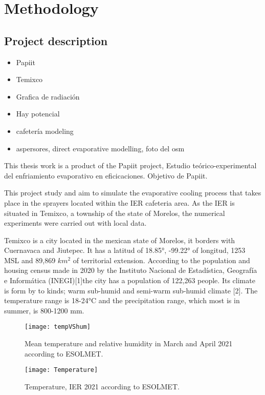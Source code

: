 \chapter{Methodology}
\label{chap:methodology}

 
 
 \section{Project description}
 
 \begin{itemize}
  	\item Papiit
 	\item Temixco
 	\item Grafica de radiación
 	\item Hay potencial
 	\item cafetería modeling
 	\item aspersores, direct evaporative modelling, foto del osm
 \end{itemize}
 

This thesis work is a product of the Papiit project, Estudio teórico-experimental del enfriamiento evaporativo en eficicaciones.
Objetivo de Papiit. 

This project study and aim to simulate the evaporative cooling process that takes place in the sprayers located within the IER cafeteria area. As the IER is situated in Temixco, a township of the state of Morelos, the numerical experiments were carried out with local data.

 Temixco is a city located in the mexican state of Morelos, it borders with Cuernavaca and Jiutepec. It has a latitud of 18.85°, -99.22° of longitud, 1253 MSL and 89,869 $km^{2}$ of territorial extension. According to the population and housing census made in 2020 by the Instituto Nacional de Estadística, Geografía e Informática (INEGI)[1]the city has a population of 122,263 people. Its climate is form by to kinds; warm sub-humid and semi-warm sub-humid climate [2]. The temperature range is 18-24°C and the precipitation range, which most is in summer, is 800-1200 mm. 
 
\begin{figure}
 \centering
 \texttt{[image: tempVShum]}
 \caption{	
 Mean temperature and relative humidity in March and April 2021 according to ESOLMET.
 \label{fig:tempvshum}
 }
\end{figure}

\begin{figure}
 \centering
 \texttt{[image: Temperature]}
 \caption{	
 Temperature, IER 2021 according to ESOLMET.
 \label{fig:temp}
 }
\end{figure}

